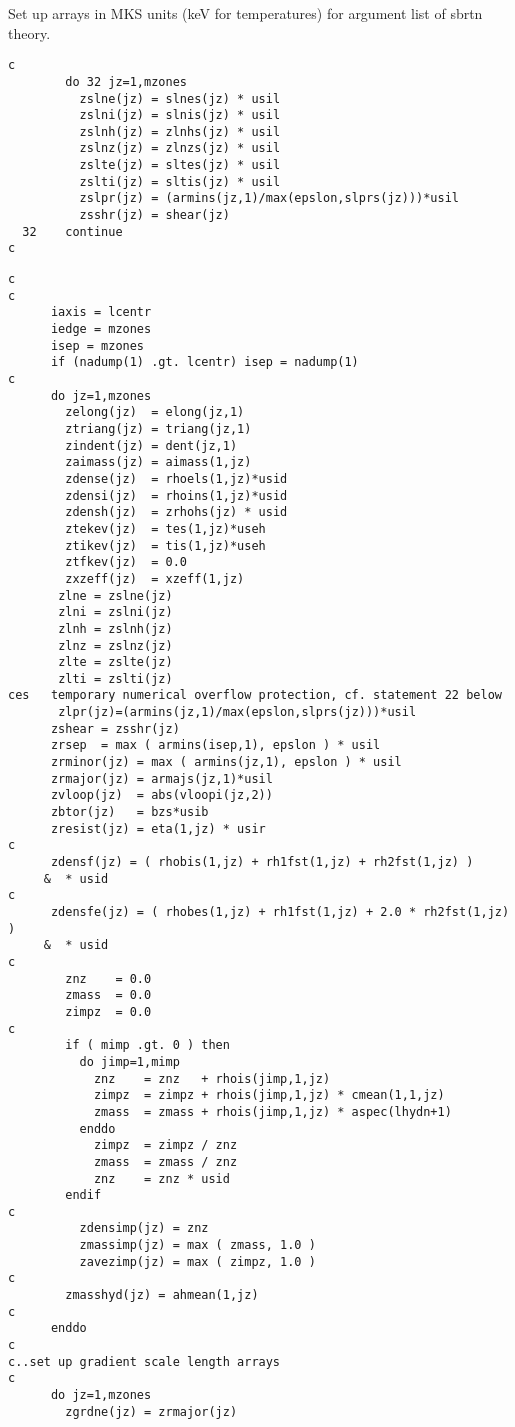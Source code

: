 Set up arrays in MKS units (keV for temperatures)
for argument list of sbrtn theory.


\begin{verbatim}
c
        do 32 jz=1,mzones
          zslne(jz) = slnes(jz) * usil
          zslni(jz) = slnis(jz) * usil
          zslnh(jz) = zlnhs(jz) * usil
          zslnz(jz) = zlnzs(jz) * usil
          zslte(jz) = sltes(jz) * usil
          zslti(jz) = sltis(jz) * usil
          zslpr(jz) = (armins(jz,1)/max(epslon,slprs(jz)))*usil
          zsshr(jz) = shear(jz)
  32    continue
c
\end{verbatim}
\begin{verbatim}
c
c
      iaxis = lcentr
      iedge = mzones
      isep = mzones
      if (nadump(1) .gt. lcentr) isep = nadump(1)
c
      do jz=1,mzones
        zelong(jz)  = elong(jz,1)
        ztriang(jz) = triang(jz,1)
        zindent(jz) = dent(jz,1)
        zaimass(jz) = aimass(1,jz)
        zdense(jz)  = rhoels(1,jz)*usid
        zdensi(jz)  = rhoins(1,jz)*usid
        zdensh(jz)  = zrhohs(jz) * usid
        ztekev(jz)  = tes(1,jz)*useh
        ztikev(jz)  = tis(1,jz)*useh
        ztfkev(jz)  = 0.0
        zxzeff(jz)  = xzeff(1,jz)
       zlne = zslne(jz)
       zlni = zslni(jz)
       zlnh = zslnh(jz)
       zlnz = zslnz(jz)
       zlte = zslte(jz)
       zlti = zslti(jz)
ces   temporary numerical overflow protection, cf. statement 22 below
       zlpr(jz)=(armins(jz,1)/max(epslon,slprs(jz)))*usil
      zshear = zsshr(jz)
      zrsep  = max ( armins(isep,1), epslon ) * usil
      zrminor(jz) = max ( armins(jz,1), epslon ) * usil
      zrmajor(jz) = armajs(jz,1)*usil
      zvloop(jz)  = abs(vloopi(jz,2))
      zbtor(jz)   = bzs*usib
      zresist(jz) = eta(1,jz) * usir
c
      zdensf(jz) = ( rhobis(1,jz) + rh1fst(1,jz) + rh2fst(1,jz) )
     &  * usid
c
      zdensfe(jz) = ( rhobes(1,jz) + rh1fst(1,jz) + 2.0 * rh2fst(1,jz) )
     &  * usid
c
        znz    = 0.0
        zmass  = 0.0
        zimpz  = 0.0
c
        if ( mimp .gt. 0 ) then
          do jimp=1,mimp
            znz    = znz   + rhois(jimp,1,jz)
            zimpz  = zimpz + rhois(jimp,1,jz) * cmean(1,1,jz)
            zmass  = zmass + rhois(jimp,1,jz) * aspec(lhydn+1)
          enddo
            zimpz  = zimpz / znz
            zmass  = zmass / znz
            znz    = znz * usid
        endif
c
          zdensimp(jz) = znz
          zmassimp(jz) = max ( zmass, 1.0 )
          zavezimp(jz) = max ( zimpz, 1.0 )
c
        zmasshyd(jz) = ahmean(1,jz)
c
      enddo
c
c..set up gradient scale length arrays
c
      do jz=1,mzones
        zgrdne(jz) = zrmajor(jz)

\end{verbatim}
